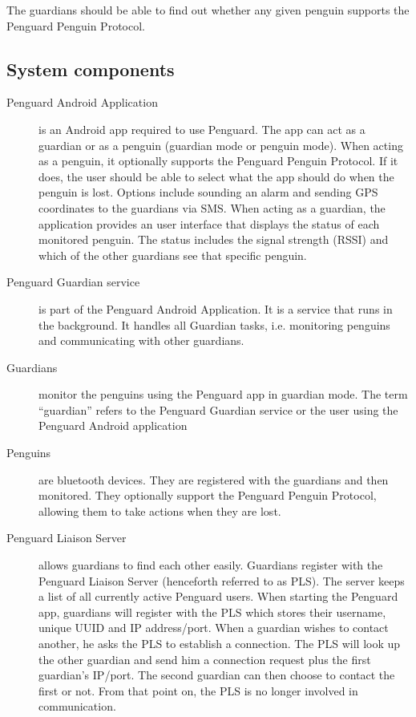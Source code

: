 \documentclass{report}
\begin{document}
The guardians should be able to find out whether any given penguin supports the Penguard Penguin Protocol.

\subsection{System components}

\begin{description}
    \item [Penguard Android Application] is an Android app required to use Penguard. The app can act as a guardian or as a penguin (guardian mode or penguin mode). When acting as a penguin, it optionally supports the Penguard Penguin Protocol. If it does, the user should be able to select what the app should do when the penguin is lost. Options include sounding an alarm and sending GPS coordinates to the guardians via SMS. When acting as a guardian, the application provides an user interface that displays the status of each monitored penguin. The status includes the signal strength (RSSI) and which of the other guardians see that specific penguin.
    \item [Penguard Guardian service] is part of the Penguard Android Application. It is a service that runs in the background. It handles all Guardian tasks, i.e. monitoring penguins and communicating with other guardians.
    \item [Guardians] monitor the penguins using the Penguard app in guardian mode. The term ``guardian'' refers to the Penguard Guardian service or the user using the Penguard Android application
    \item [Penguins] are bluetooth devices. They are registered with the guardians and then monitored. They optionally support the Penguard Penguin Protocol, allowing them to take actions when they are lost.
    \item [Penguard Liaison Server] allows guardians to find each other easily. Guardians register with the Penguard Liaison Server (henceforth referred to as PLS). The server keeps a list of all currently active Penguard users. When starting the Penguard app, guardians will register with the PLS which stores their username, unique UUID and IP address/port. When a guardian wishes to contact another, he asks the PLS to establish a connection. The PLS will look up the other guardian and send him a connection request plus the first guardian's IP/port. The second guardian can then choose to contact the first or not. From that point on, the PLS is no longer involved in communication.
\end{description}
\end{document}
